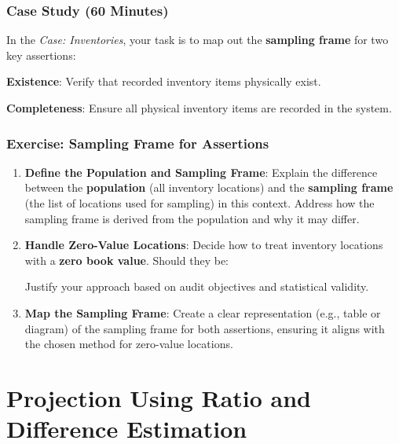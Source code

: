 \documentclass[12pt,a4paper]{memoir}
\begin{document}
\newpage
\subsection*{Case Study (60 Minutes)}
In the \emph{Case: Inventories}, your task is to map out the \textbf{sampling frame} for two key assertions:
\begin{compactitem}
    \item \textbf{Existence}: Verify that recorded inventory items physically exist.
    \item \textbf{Completeness}: Ensure all physical inventory items are recorded in the system.
\end{compactitem}

\subsection*{Exercise: Sampling Frame for Assertions}
\begin{enumerate}
    \item \textbf{Define the Population and Sampling Frame}:
    Explain the difference between the \textbf{population} (all inventory locations) and the \textbf{sampling frame} (the list of locations used for sampling) in this context. Address how the sampling frame is derived from the population and why it may differ.

    \item \textbf{Handle Zero-Value Locations}:
    Decide how to treat inventory locations with a \textbf{zero book value}. Should they be:
    Justify your approach based on audit objectives and statistical validity.

    \item \textbf{Map the Sampling Frame}:
    Create a clear representation (e.g., table or diagram) of the sampling frame for both assertions, ensuring it aligns with the chosen method for zero-value locations.
\end{enumerate}

\chapter{Projection Using Ratio and Difference Estimation}
\end{document}
